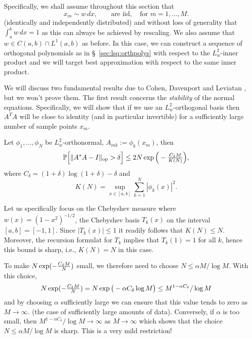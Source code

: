 Specifically, we shall assume throughout this section that
\begin{equation}
    \label{eq:lsw:wm_law}
    x_m \sim w \,dx, \qquad \text{are iid}, \quad \text{for } m = 1, \dots, M.
\end{equation}
(identically and independently distributed) and without loss of generality that
$\int_a^b w \,dx = 1$ as this can always be achieved by rescaling. We also
assume that $w \in C(a,b) \cap L^1(a,b)$ as before. In this case, we can
construct a sequence of orthogonal polynomials as in \S~\ref{sec:lsq:orthpolys}
with respect to the $L^2_w$-inner product and we will target best approximation
with respect to the same inner product.

We will discuss two fundamental results due to Cohen, Davenport and Leviatan
\cite{Cohen2013-yj}, but we won't prove them.  The first result concerns the
{\em stability} of the normal equations. Specifically, we will show that if we
use an $L^2_w$-orthogonal basis then $A^T A$ will be close to identity (and in
particular invertible) for a sufficiently large number of sample points $x_m$.



\begin{theorem}[Stability] \label{th:lsq:randstab}
    Let $\phi_1, \dots, \phi_N$ be $L^2_w$-orthonormal, $A_{mk} := \phi_k(x_m)$,
    then
    \[
        \mathbb{P}\Big[ \| A^* A - I \|_{\rm op} > \delta\Big]
        \leq 2 N \exp\Big( - {\textstyle \frac{C_\delta M}{K(N)}}\Big),
    \]
    where $C_\delta = (1+\delta) \log (1+\delta) - \delta$ and
    \[
        K(N) = \sup_{x \in [a,b]} \sum_{k = 1}^N |\phi_k(x)|^2.
    \]
\end{theorem}

Let us specifically focus on the Chebyshev measure where $w(x) =
(1-x^2)^{-1/2}$, the Chebyshev basis $T_k(x)$ on the interval $[a,b]= [-1,1]$.
Since $|T_k(x)| \leq 1$ it readily follows that $K(N) \leq N$. Moreover, the
recursion formulat for $T_k$ implies that $T_k(1) = 1$ for all $k$, hence this
bound is sharp, i.e., $K(N) = N$ in this case.

To make $N \exp( - {\textstyle \frac{C_\delta M}{N}})$ small, we therefore need
to choose $N \leq \alpha M / \log M$. With this choice,
\[
    N \exp( - {\textstyle \frac{C_\delta M}{N}})
    =
    N \exp\big( - \alpha C_\delta \log M\big)
    \leq
    M^{1 -\alpha C_\delta} / \log M
\]
and by choosing $\alpha$ sufficiently large we can ensure that this value tends
to zero as $M \to \infty$. (the case of sufficiently large amounts of data).
Conversely, if $\alpha$ is too small, then $M^{1 -\alpha C_\delta} / \log M \to
\infty$ as $M \to \infty$ which shows that the choice $N \leq \alpha M/\log M$
is sharp. This is a very mild restriction!

